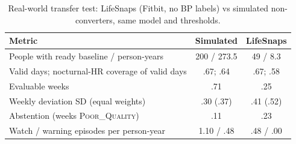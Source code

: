 \documentclass[conference]{IEEEtran}
\begin{document}
\begin{table}[t]
\centering
\caption{Real-world transfer test: LifeSnaps (Fitbit, no BP labels) vs simulated non-converters, same model and thresholds.}
\label{tab:rw}
\footnotesize
\begin{tabular}{@{}lcc@{}}
\toprule
Metric & Simulated & LifeSnaps \\
\midrule
People with ready baseline / person-years & 200 / 273.5 & 49 / 8.3 \\
Valid days; nocturnal-HR coverage of valid days & .67; .64 & .67; .58 \\
Evaluable weeks & .71 & .25 \\
Weekly deviation SD (equal weights) & .30 (.37) & .41 (.52) \\
Abstention (weeks \textsc{Poor\_Quality}) & .11 & .23 \\
Watch / warning episodes per person-year & 1.10 / .48 & .48 / .00 \\
\bottomrule
\end{tabular}
\end{table}
\end{document}
